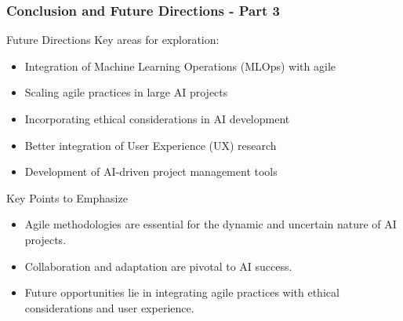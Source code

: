 \documentclass{beamer}
\begin{document}
\begin{frame}[fragile]
    \frametitle{Conclusion and Future Directions - Part 3}
    \begin{block}{Future Directions}
        Key areas for exploration:
    \end{block}
    \begin{itemize}
        \item Integration of Machine Learning Operations (MLOps) with agile
        \item Scaling agile practices in large AI projects
        \item Incorporating ethical considerations in AI development
        \item Better integration of User Experience (UX) research
        \item Development of AI-driven project management tools
    \end{itemize}
    
    \begin{block}{Key Points to Emphasize}
        \begin{itemize}
            \item Agile methodologies are essential for the dynamic and uncertain nature of AI projects.
            \item Collaboration and adaptation are pivotal to AI success.
            \item Future opportunities lie in integrating agile practices with ethical considerations and user experience.
        \end{itemize}
    \end{block}
\end{frame}
\end{document}
